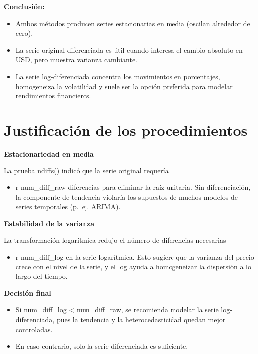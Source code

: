 \documentclass[
  11pt,
]{book}
\providecommand{\tightlist}{%
  \setlength{\itemsep}{0pt}\setlength{\parskip}{0pt}}
\begin{document}
\textbf{Conclusión:}

\begin{itemize}
\item
  Ambos métodos producen series estacionarias en media (oscilan alrededor de cero).
\item
  La serie original diferenciada es útil cuando interesa el cambio absoluto en USD, pero muestra varianza cambiante.
\item
  La serie log-diferenciada concentra los movimientos en porcentajes, homogeneiza la volatilidad y suele ser la opción preferida para modelar rendimientos financieros.
\end{itemize}

\section{Justificación de los procedimientos}\label{justificaciuxf3n-de-los-procedimientos}

\textbf{Estacionariedad en media}

La prueba ndiffs() indicó que la serie original requería

\begin{itemize}
\tightlist
\item
  r num\_diff\_raw diferencias para eliminar la raíz unitaria.
  Sin diferenciación, la componente de tendencia violaría los supuestos de muchos modelos de series temporales (p.~ej. ARIMA).
\end{itemize}

\textbf{Estabilidad de la varianza}

La transformación logarítmica redujo el número de diferencias necesarias

\begin{itemize}
\tightlist
\item
  r num\_diff\_log en la serie logarítmica.
  Esto sugiere que la varianza del precio crece con el nivel de la serie, y el log ayuda a homogeneizar la dispersión a lo largo del tiempo.
\end{itemize}

\textbf{Decisión final}

\begin{itemize}
\item
  Si num\_diff\_log \textless{} num\_diff\_raw, se recomienda modelar la serie log-diferenciada, pues la tendencia y la heterocedasticidad quedan mejor controladas.
\item
  En caso contrario, solo la serie diferenciada es suficiente.
\end{itemize}
\end{document}
